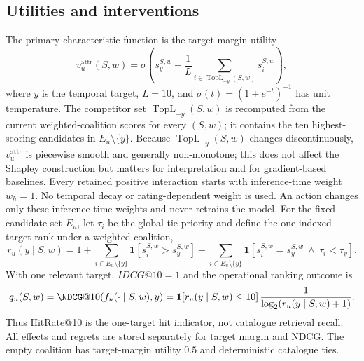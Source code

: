 \documentclass[pdflatex,sn-mathphys-num]{sn-jnl}
\theoremstyle{thmstyleone}
\theoremstyle{thmstyletwo}
\theoremstyle{thmstylethree}
\begin{document}
\subsection{Utilities and interventions}
The primary characteristic function is the target-margin utility
\begin{equation}
v_u^{\mathrm{attr}}(S,w)=\sigma\left(s_y^{S,w}-\frac{1}{L}\sum_{i\in\operatorname{TopL}_{-y}(S,w)}s_i^{S,w}\right),
\end{equation}
where $y$ is the temporal target, $L=10$, and $\sigma(t)=(1+e^{-t})^{-1}$ has unit temperature. The competitor set $\operatorname{TopL}_{-y}(S,w)$ is recomputed from the current weighted-coalition scores for every $(S,w)$; it contains the ten highest-scoring candidates in $E_u\setminus\{y\}$. Because $\operatorname{TopL}_{-y}(S,w)$ changes discontinuously, $v_u^{\mathrm{attr}}$ is piecewise smooth and generally non-monotone; this does not affect the Shapley construction but matters for interpretation and for gradient-based baselines. Every retained positive interaction starts with inference-time weight $w_h=1$. No temporal decay or rating-dependent weight is used. An action changes only these inference-time weights and never retrains the model. For the fixed candidate set $E_u$, let $\tau_i$ be the global tie priority and define the one-indexed target rank under a weighted coalition,
\begin{equation}
r_u(y\mid S,w)=1+\sum_{i\in E_u\setminus\{y\}}\mathbf{1}[s_i^{S,w}>s_y^{S,w}]
+\sum_{i\in E_u\setminus\{y\}}\mathbf{1}[s_i^{S,w}=s_y^{S,w}\ \wedge\ \tau_i<\tau_y].
\end{equation}
With one relevant target, $IDCG@10=1$ and the operational ranking outcome is
\begin{equation}
q_u(S,w)=\NDCG@10(f_u(\cdot\mid S,w),y)=\mathbf{1}[r_u(y\mid S,w)\le10]\,\frac{1}{\log_2(r_u(y\mid S,w)+1)}.
\label{eq:ndcg-one-target}
\end{equation}
Thus HitRate@10 is the one-target hit indicator, not catalogue retrieval recall.
All effects and regrets are stored separately for target margin and NDCG. The empty coalition has target-margin utility $0.5$ and deterministic catalogue ties.
\end{document}
